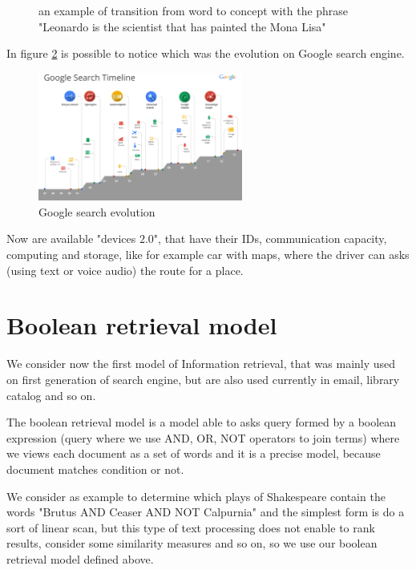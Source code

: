 \begin{description}
\begin{figure}
                                    \caption{an example of transition from word to concept with the phrase
                                             "Leonardo is the scientist that has painted the Mona Lisa"}
                                    \label{img:leonardo}
                                \end{figure}
\end{description}
In figure \ref{img:googleEvolution} is possible to notice which was the evolution on Google search engine.

\begin{figure}
    \caption{Google search evolution}
    \label{img:googleEvolution}
    \includegraphics[width=0.6\textwidth]{Images/googleGeneration}
\end{figure}
Now are available "devices $2.0$", that have their IDs, communication capacity, computing and storage, like
for example car with maps, where the driver can asks (using text or voice audio) the route for a place.

\section{Boolean retrieval model}
We consider now the first model of Information retrieval, that was mainly used on first generation of search engine,
but are also used currently in email, library catalog and so on.

\begin{defi}
The boolean retrieval model is a model able to asks query formed by a boolean expression (query where we use 
AND, OR, NOT operators to join terms) where we views each document as a set of words and it is a precise model,
because document matches condition or not.
\end{defi}

We consider as example to determine which plays of Shakespeare contain the words 
"Brutus AND Ceaser AND NOT Calpurnia" and the simplest form is do a sort of linear scan, but this type
of text processing does not enable to rank results, consider some similarity measures and so on, so we use 
our boolean retrieval model defined above.


